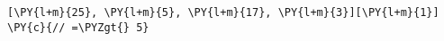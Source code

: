 \begin{Verbatim}[commandchars=\\\{\}]
[\PY{l+m}{25}, \PY{l+m}{5}, \PY{l+m}{17}, \PY{l+m}{3}][\PY{l+m}{1}] \PY{c}{// =\PYZgt{} 5}
\end{Verbatim}
